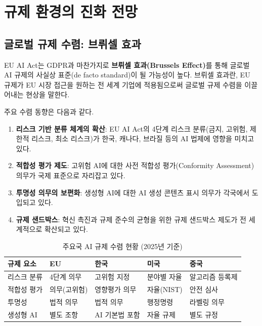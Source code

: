 \section{규제 환경의 진화 전망}
\label{sec:20.2}

\subsection{글로벌 규제 수렴: 브뤼셀 효과}
\label{sec:20.2.1}

EU AI Act는 GDPR과 마찬가지로 \textbf{브뤼셀 효과(Brussels Effect)}를 통해 글로벌 AI 규제의 사실상 표준(de facto standard)이 될 가능성이 높다. 브뤼셀 효과란, EU 규제가 EU 시장 접근을 원하는 전 세계 기업에 적용됨으로써 글로벌 규제 수렴을 이끌어내는 현상을 말한다.

주요 수렴 동향은 다음과 같다.

\begin{enumerate}
 \item \textbf{리스크 기반 분류 체계의 확산}: EU AI Act의 4단계 리스크 분류(금지, 고위험, 제한적 리스크, 최소 리스크)가 한국, 캐나다, 브라질 등의 AI 법제에 영향을 미치고 있다.
 \item \textbf{적합성 평가 제도}: 고위험 AI에 대한 사전 적합성 평가(Conformity Assessment) 의무가 국제 표준으로 자리잡고 있다.
 \item \textbf{투명성 의무의 보편화}: 생성형 AI에 대한 AI 생성 콘텐츠 표시 의무가 각국에서 도입되고 있다.
 \item \textbf{규제 샌드박스}: 혁신 촉진과 규제 준수의 균형을 위한 규제 샌드박스 제도가 전 세계적으로 확산되고 있다.
\end{enumerate}

\begin{table}[htbp]
\centering
\caption{주요국 AI 규제 수렴 현황 (2025년 기준)}
\label{tab:20_reg_convergence}
\begin{tabularx}{\textwidth}{p{2cm}p{2.5cm}p{2.5cm}p{2.5cm}X}
\toprule
\textbf{규제 요소} & \textbf{EU} & \textbf{한국} & \textbf{미국} & \textbf{중국} \\
\midrule
리스크 분류 & 4단계 의무 & 고위험 지정 & 분야별 자율 & 알고리즘 등록제 \\
적합성 평가 & 의무(고위험) & 영향평가 의무 & 자율(NIST) & 안전 심사 \\
투명성 & 법적 의무 & 법적 의무 & 행정명령 & 라벨링 의무 \\
생성형 AI & 별도 조항 & AI 기본법\cite{cset2025korea_ai_act} 포함 & 자율 규제 & 별도 규정 \\
\bottomrule
\end{tabularx}
\end{table}

